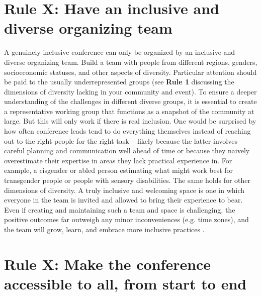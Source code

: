 \documentclass[10pt,letterpaper]{article}
\begin{document}
\section{Rule X: Have an inclusive and diverse organizing team}
\label{rule_organizing_team}
A genuinely inclusive conference can only be organized by an inclusive and diverse organizing team. Build a team with people from different regions, genders, socioeconomic statuses, and other aspects of diversity. Particular attention should be paid to the usually underrepresented groups (see \textbf{Rule 1} discussing the dimensions of diversity lacking in your community and event). To ensure a deeper understanding of the challenges in different diverse groups, it is essential to create a representative working group that functions as a snapshot of the community at large. But this will only work if there is real inclusion. One would be surprised by how often conference leads tend to do everything themselves instead of reaching out to the right people for the right task -- likely because the latter involves careful planning and communication well ahead of time or because they naively overestimate their expertise in areas they lack practical experience in. For example, a cisgender or abled person estimating what might work best for transgender people or people with sensory disabilities. The same holds for other dimensions of diversity. A truly inclusive and welcoming space is one in which everyone in the team is invited and allowed to bring their experience to bear. Even if creating and maintaining such a team and space is challenging, the positive outcomes far outweigh any minor inconveniences (e.g. time zones), and the team will grow, learn, and embrace more inclusive practices \cite{hong_groups_2004}. 



\section{Rule X: Make the conference accessible to all, from start to end}
\end{document}
